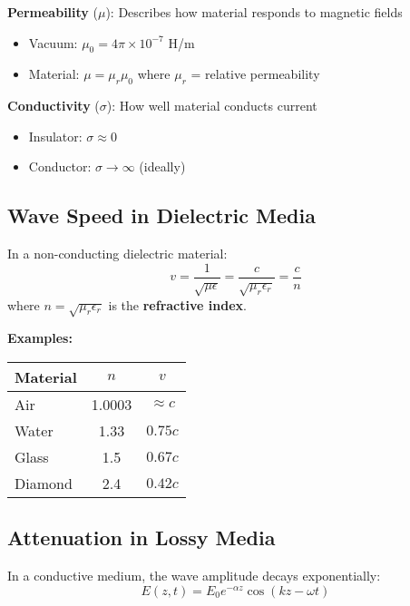 \textbf{Permeability} ($\mu$): Describes how material responds to magnetic fields
\begin{itemize}
\item Vacuum: $\mu_0 = 4\pi \times 10^{-7}$ H/m
\item Material: $\mu = \mu_r \mu_0$ where $\mu_r$ = relative permeability
\end{itemize}

\textbf{Conductivity} ($\sigma$): How well material conducts current
\begin{itemize}
\item Insulator: $\sigma \approx 0$
\item Conductor: $\sigma \rightarrow \infty$ (ideally)
\end{itemize}

\subsection{Wave Speed in Dielectric Media}

In a non-conducting dielectric material:
\begin{equation}
v = \frac{1}{\sqrt{\mu\epsilon}} = \frac{c}{\sqrt{\mu_r\epsilon_r}} = \frac{c}{n}
\label{eq:wave-speed-medium}
\end{equation}
where $n = \sqrt{\mu_r\epsilon_r}$ is the \textbf{refractive index}.

\textbf{Examples:}
\begin{center}
\begin{tabular}{@{}lcc@{}}
\toprule
Material & $n$ & $v$ \\
\midrule
Air & 1.0003 & $\approx c$ \\
Water & 1.33 & $0.75c$ \\
Glass & 1.5 & $0.67c$ \\
Diamond & 2.4 & $0.42c$ \\
\bottomrule
\end{tabular}
\end{center}

\subsection{Attenuation in Lossy Media}

In a conductive medium, the wave amplitude decays exponentially:
\begin{equation}
E(z,t) = E_0 e^{-\alpha z} \cos(kz - \omega t)
\label{eq:attenuation}
\end{equation}

